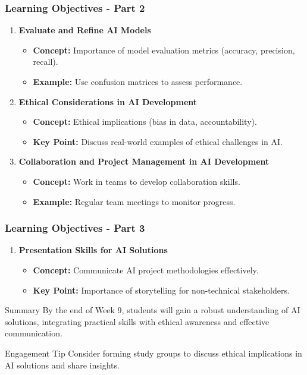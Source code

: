 \documentclass[aspectratio=169]{beamer}
\begin{document}
\begin{frame}[fragile]
    \frametitle{Learning Objectives - Part 2}
    \begin{enumerate}[resume]
        \item \textbf{Evaluate and Refine AI Models}
            \begin{itemize}
                \item \textbf{Concept:} Importance of model evaluation metrics (accuracy, precision, recall).
                \item \textbf{Example:} Use confusion matrices to assess performance.
            \end{itemize}

        \item \textbf{Ethical Considerations in AI Development}
            \begin{itemize}
                \item \textbf{Concept:} Ethical implications (bias in data, accountability).
                \item \textbf{Key Point:} Discuss real-world examples of ethical challenges in AI.
            \end{itemize}

        \item \textbf{Collaboration and Project Management in AI Development}
            \begin{itemize}
                \item \textbf{Concept:} Work in teams to develop collaboration skills.
                \item \textbf{Example:} Regular team meetings to monitor progress.
            \end{itemize}
    \end{enumerate}
\end{frame}

\begin{frame}[fragile]
    \frametitle{Learning Objectives - Part 3}
    \begin{enumerate}[resume]
        \item \textbf{Presentation Skills for AI Solutions}
            \begin{itemize}
                \item \textbf{Concept:} Communicate AI project methodologies effectively.
                \item \textbf{Key Point:} Importance of storytelling for non-technical stakeholders.
            \end{itemize}
    \end{enumerate}

    \begin{block}{Summary}
        By the end of Week 9, students will gain a robust understanding of AI solutions, integrating practical skills with ethical awareness and effective communication.
    \end{block}
    
    \begin{block}{Engagement Tip}
        Consider forming study groups to discuss ethical implications in AI solutions and share insights.
    \end{block}
\end{frame}
\end{document}
